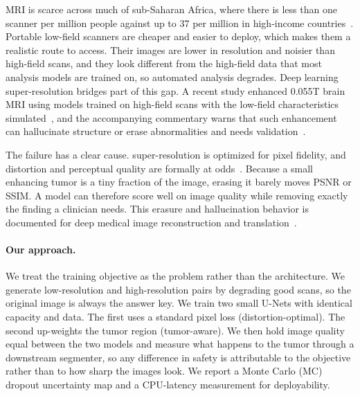 \documentclass[11pt,a4paper]{article}
\newcommand{\SR}{super-resolution\xspace}
\begin{document}
MRI is scarce across much of sub-Saharan Africa, where there is less than one scanner per million people against up to 37 per million in high-income countries~\cite{anazodo2024}. Portable low-field scanners are cheaper and easier to deploy, which makes them a realistic route to access. Their images are lower in resolution and noisier than high-field scans, and they look different from the high-field data that most analysis models are trained on, so automated analysis degrades. Deep learning \SR bridges part of this gap. A recent study enhanced 0.055T brain MRI using models trained on high-field scans with the low-field characteristics simulated~\cite{man2023}, and the accompanying commentary warns that such enhancement can hallucinate structure or erase abnormalities and needs validation~\cite{johnson2023}.

The failure has a clear cause. \SR is optimized for pixel fidelity, and distortion and perceptual quality are formally at odds~\cite{blau2018}. Because a small enhancing tumor is a tiny fraction of the image, erasing it barely moves PSNR or SSIM. A model can therefore score well on image quality while removing exactly the finding a clinician needs. This erasure and hallucination behavior is documented for deep medical image reconstruction and translation~\cite{antun2020,cohen2018,bhadra2021}.

\paragraph{Our approach.}
We treat the training objective as the problem rather than the architecture. We generate low-resolution and high-resolution pairs by degrading good scans, so the original image is always the answer key. We train two small U-Nets with identical capacity and data. The first uses a standard pixel loss (distortion-optimal). The second up-weights the tumor region (tumor-aware). We then hold image quality equal between the two models and measure what happens to the tumor through a downstream segmenter, so any difference in safety is attributable to the objective rather than to how sharp the images look. We report a Monte Carlo (MC) dropout uncertainty map and a CPU-latency measurement for deployability.
\end{document}
